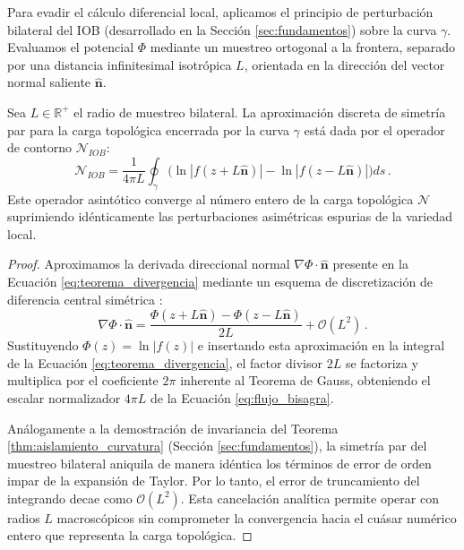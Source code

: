 \documentclass[11pt]{article}
\begin{document}
Para evadir el cálculo diferencial local, aplicamos el principio de perturbación bilateral del IOB (desarrollado en la Sección \ref{sec:fundamentos}) sobre la curva $\gamma$. Evaluamos el potencial $\Phi$ mediante un muestreo ortogonal a la frontera, separado por una distancia infinitesimal isotrópica $L$, orientada en la dirección del vector normal saliente $\mathbf{\hat{n}}$.

\begin{theorem} \label{thm:teorema_flujo}
Sea $L \in \mathbb{R}^+$ el radio de muestreo bilateral. La aproximación discreta de simetría par para la carga topológica encerrada por la curva $\gamma$ está dada por el operador de contorno $\mathcal{N}_{IOB}$:
\begin{equation}
    \label{eq:flujo_bisagra}
    \mathcal{N}_{IOB} = \frac{1}{4\pi L} \oint_{\gamma} \Big( \ln|f(z + L\mathbf{\hat{n}})| - \ln|f(z - L\mathbf{\hat{n}})| \Big) ds \,.
\end{equation}
Este operador asintótico converge al número entero de la carga topológica $\mathcal{N}$ suprimiendo idénticamente las perturbaciones asimétricas espurias de la variedad local.
\end{theorem}

\begin{proof}
Aproximamos la derivada direccional normal $\nabla \Phi \cdot \mathbf{\hat{n}}$ presente en la Ecuación \eqref{eq:teorema_divergencia} mediante un esquema de discretización de diferencia central simétrica \cite{burden2015numerical}:
\begin{equation*}
    \nabla \Phi \cdot \mathbf{\hat{n}} = \frac{\Phi(z + L\mathbf{\hat{n}}) - \Phi(z - L\mathbf{\hat{n}})}{2L} + \mathcal{O}(L^2) \,.
\end{equation*}
Sustituyendo $\Phi(z) = \ln|f(z)|$ e insertando esta aproximación en la integral de la Ecuación \eqref{eq:teorema_divergencia}, el factor divisor $2L$ se factoriza y multiplica por el coeficiente $2\pi$ inherente al Teorema de Gauss, obteniendo el escalar normalizador $4\pi L$ de la Ecuación \eqref{eq:flujo_bisagra}. 

Análogamente a la demostración de invariancia del Teorema \ref{thm:aislamiento_curvatura} (Sección \ref{sec:fundamentos}), la simetría par del muestreo bilateral aniquila de manera idéntica los términos de error de orden impar de la expansión de Taylor. Por lo tanto, el error de truncamiento del integrando decae como $\mathcal{O}(L^2)$. Esta cancelación analítica permite operar con radios $L$ macroscópicos sin comprometer la convergencia hacia el cuásar numérico entero que representa la carga topológica.
\end{proof}
\end{document}
